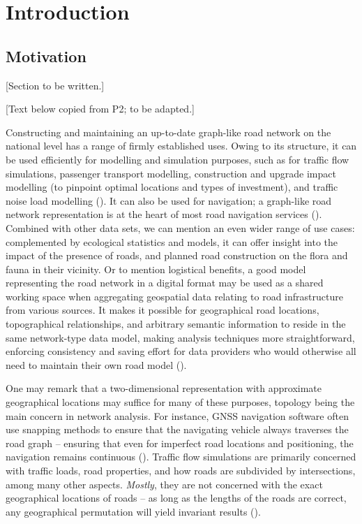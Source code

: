 
\chapter{Introduction}
\label{chap:i}

\section{Motivation}
\label{sec:motivation}

[Section to be written.]

[Text below copied from P2; to be adapted.]

Constructing and maintaining an up-to-date graph-like road network on the national level has a range of firmly established uses. Owing to its structure, it can be used efficiently for modelling and simulation purposes, such as for traffic flow simulations, passenger transport modelling, construction and upgrade impact modelling (to pinpoint optimal locations and types of investment), and traffic noise load modelling (\cite{bell_lida_1997, zhu_li_2007, zhang_2011, duran_santos_2014, peng_etal_2020}). It can also be used for navigation; a graph-like road network representation is at the heart of most road navigation services (\cite{yue_etal_2008}). Combined with other data sets, we can mention an even wider range of use cases: complemented by ecological statistics and models, it can offer insight into the impact of the presence of roads, and planned road construction on the flora and fauna in their vicinity. Or to mention logistical benefits, a good model representing the road network in a digital format may be used as a shared working space when aggregating geospatial data relating to road infrastructure from various sources. It makes it possible for geographical road locations, topographical relationships, and arbitrary semantic information to reside in the same network-type data model, making analysis techniques more straightforward, enforcing consistency and saving effort for data providers who would otherwise all need to maintain their own road model (\cite{ekpenyong_etal_2007}).

One may remark that a two-dimensional representation with approximate geographical locations may suffice for many of these purposes, topology being the main concern in network analysis. For instance, GNSS navigation software often use snapping methods to ensure that the navigating vehicle always traverses the road graph – ensuring that even for imperfect road locations and positioning, the navigation remains continuous (\cite{fouque_bonnifait_2008, chen_hsu_2020}). Traffic flow simulations are primarily concerned with traffic loads, road properties, and how roads are subdivided by intersections, among many other aspects. \textit{Mostly}, they are not concerned with the exact geographical locations of roads – as long as the lengths of the roads are correct, any geographical permutation will yield invariant results (\cite{thomson_richardson_1995}).


